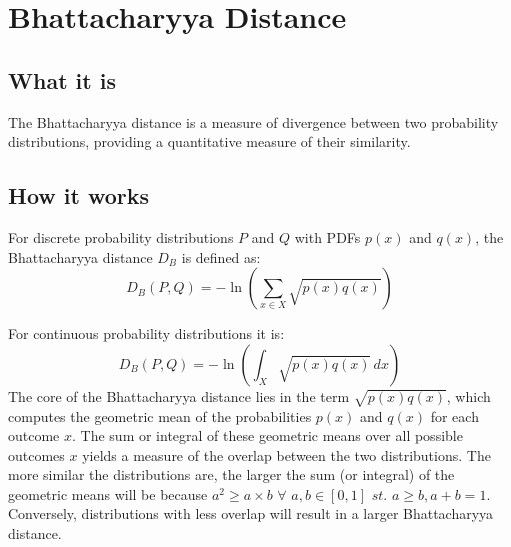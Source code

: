 \documentclass[12pt]{article}
\begin{document}
\section{Bhattacharyya Distance}

\subsection{What it is}
The Bhattacharyya distance is a measure of divergence between two probability distributions, providing a quantitative measure of their similarity.

\subsection{How it works}
For discrete probability distributions \(P\) and \(Q\) with PDFs \(p(x)\) and \(q(x)\), the Bhattacharyya distance \(D_B\) is defined as:
\[ D_B(P, Q) = -\ln\left(\sum_{x \in X} \sqrt{p(x)q(x)}\right) \] 

For continuous probability distributions it is:
\[
D_B(P, Q) = -\ln\left(\int_{X} \sqrt{p(x)q(x)} \, dx\right)
\]
The core of the Bhattacharyya distance lies in the term \(\sqrt{p(x)q(x)}\), which computes the geometric mean of the probabilities \(p(x)\) and \(q(x)\) for each outcome \(x\). The sum or integral of these geometric means over all possible outcomes \(x\) yields a measure of the overlap between the two distributions. The more similar the distributions are, the larger the sum (or integral) of the geometric means will be because \(a^2 \geq a \times b\) \(\forall\) \(a, b \in [0, 1]\) \(st.\) \(a \geq b, a + b = 1\). Conversely, distributions with less overlap will result in a larger Bhattacharyya distance.
\end{document}
